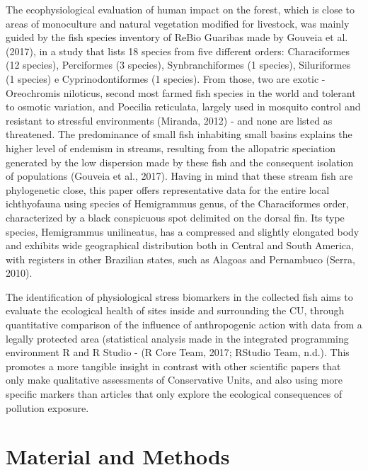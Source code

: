 \documentclass[
  american,
  letterpaper,
  DIV=11,
  numbers=noendperiod]{scrartcl}
\begin{document}
The ecophysiological evaluation of human impact on the forest, which is
close to areas of monoculture and natural vegetation modified for
livestock, was mainly guided by the fish species inventory of ReBio
Guaribas made by Gouveia et al. (2017), in a study that lists 18 species
from five different orders: Characiformes (12 species), Perciformes (3
species), Synbranchiformes (1 species), Siluriformes (1 species) e
Cyprinodontiformes (1 species). From those, two are exotic - Oreochromis
niloticus, second most farmed fish species in the world and tolerant to
osmotic variation, and Poecilia reticulata, largely used in mosquito
control and resistant to stressful environments (Miranda, 2012) - and
none are listed as threatened. The predominance of small fish inhabiting
small basins explains the higher level of endemism in streams, resulting
from the allopatric speciation generated by the low dispersion made by
these fish and the consequent isolation of populations (Gouveia et al.,
2017). Having in mind that these stream fish are phylogenetic close,
this paper offers representative data for the entire local ichthyofauna
using species of Hemigrammus genus, of the Characiformes order,
characterized by a black conspicuous spot delimited on the dorsal fin.
Its type species, Hemigrammus unilineatus, has a compressed and slightly
elongated body and exhibits wide geographical distribution both in
Central and South America, with registers in other Brazilian states,
such as Alagoas and Pernambuco (Serra, 2010).

The identification of physiological stress biomarkers in the collected
fish aims to evaluate the ecological health of sites inside and
surrounding the CU, through quantitative comparison of the influence of
anthropogenic action with data from a legally protected area
(statistical analysis made in the integrated programming environment R
and R Studio - (R Core Team, 2017; RStudio Team, n.d.). This promotes a
more tangible insight in contrast with other scientific papers that only
make qualitative assessments of Conservative Units, and also using more
specific markers than articles that only explore the ecological
consequences of pollution exposure.

\section{Material and Methods}\label{material-and-methods}
\end{document}
